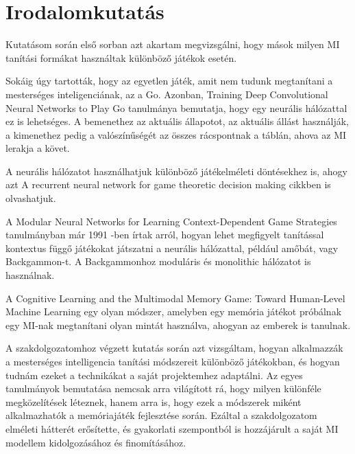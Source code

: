\chapter{Irodalomkutatás}

\thispagestyle{fancy}
\pagestyle{fancy}

Kutatásom során első sorban azt akartam megvizsgálni, hogy mások milyen MI tanítási formákat használtak különböző játékok esetén. 

Sokáig úgy tartották, hogy az egyetlen játék, amit nem tudunk megtanítani a mesterséges inteligenciának, az a Go. Azonban, Training Deep Convolutional Neural Networks to Play Go tanulmánya \cite{pmlr-v37-clark15} bemutatja,
 hogy egy neurális hálózattal ez is lehetséges. A bemenethez az aktuális állapotot, az aktuális állást használják, a kimenethez pedig a valószínűségét az összes rácspontnak a táblán, ahova az MI lerakja a követ. 

 A neurális hálózatot használhatjuk különböző játékelméleti döntésekhez is, ahogy azt A recurrent neural network for game theoretic decision making \cite{bhatia2014recurrent} cikkben is olvashatjuk. 

A Modular Neural Networks for Learning Context-Dependent Game Strategies \cite{boyan1992modular} tanulmányban már 1991 -ben írtak arról, hogyan lehet megfigyelt tanítással kontextus függő játékokat játszatni a neurális hálózattal, például amőbát, vagy Backgammon-t. A Backgammonhoz moduláris és monolithic hálózatot is használnak. 

A Cognitive Learning and the Multimodal Memory Game: Toward Human-Level Machine Learning \cite{4634261} egy olyan módszer, amelyben egy memória játékot próbálnak egy MI-nak megtanítani olyan mintát használva, ahogyan az emberek is tanulnak.

A szakdolgozatomhoz végzett kutatás során azt vizsgáltam, hogyan alkalmazzák a mesterséges intelligencia tanítási módszereit különböző játékokban, és hogyan tudnám ezeket a technikákat a saját projektemhez adaptálni.
Az egyes tanulmányok bemutatása nemcsak arra világított rá, hogy milyen különféle megközelítések léteznek, hanem arra is, hogy ezek a módszerek miként alkalmazhatók a memóriajáték fejlesztése során. 
Ezáltal a szakdolgozatom elméleti hátterét erősítette, és gyakorlati szempontból is hozzájárult a saját MI modellem kidolgozásához és finomításához.